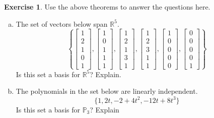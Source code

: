 \documentclass[10pt]{book}
\theoremstyle{definition}
\newtheorem{exercise}{Exercise}[section]
\newcommand{\R}{\mathbb{R}}
\newcommand{\Poly}{\mathbb{P}}
\begin{document}
\begin{exercise} %
	Use the above theorems to answer the questions here.
	\begin{multicols}{2}
		\begin{enumerate}[(a)]
			\item The set of vectors below span $\R^5$.
			$$\left\{
			\begin{bmatrix}1\\2\\1\\0\\1\end{bmatrix},
			\begin{bmatrix}1\\0\\1\\1\\1\end{bmatrix},
			\begin{bmatrix}1\\2\\1\\3\\1\end{bmatrix},
			\begin{bmatrix}1\\2\\3\\1\\1\end{bmatrix},
			\begin{bmatrix}1\\0\\0\\0\\0\end{bmatrix},
			\begin{bmatrix}0\\0\\0\\0\\1\end{bmatrix}
			\right\}$$
			Is this set a basis for $\R^5$? Explain.
			
			\columnbreak
			\item The polynomials in the set below are linearly independent.
			$$ \{1, 2t , -2+4t^2 ,  -12t+8t^3 \} $$
			Is this set a basis for $\Poly_3$? Explain
		\end{enumerate}
	\end{multicols}
\end{exercise}
\vspace{1in}
\end{document}
